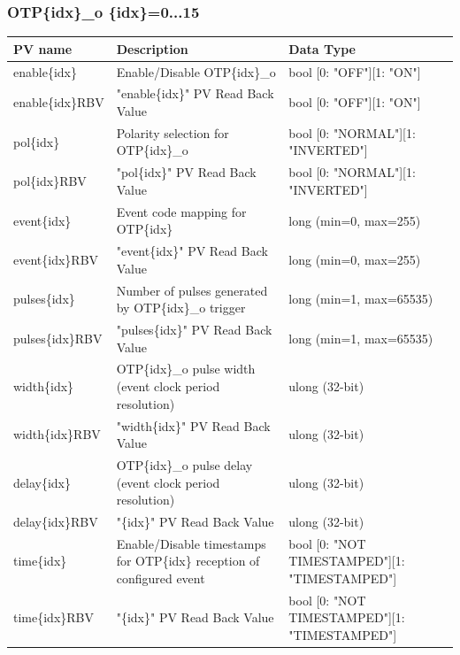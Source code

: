 \documentclass[openany]{article}
\begin{document}
		\subsubsection{OTP\{idx\}\_o \{idx\}=0...15}\label{pvgroup:evre-otp}
			\begin{center}
			\begin{tabular}{| m{2.8cm} m{6cm} m{6cm} |}
			    \hline
			    \bfseries PV name & \bfseries Description & \bfseries Data Type \\ \hline
			    enable\{idx\} & Enable/Disable OTP\{idx\}\_o & bool [0: "OFF"][1: "ON"] \\ \hline
			    enable\{idx\}RBV & "enable\{idx\}" PV Read Back Value & bool [0: "OFF"][1: "ON"] \\ \hline
			    pol\{idx\} & Polarity selection for OTP\{idx\}\_o & bool [0: "NORMAL"][1: "INVERTED"] \\ \hline
			    pol\{idx\}RBV & "pol\{idx\}" PV Read Back Value & bool [0: "NORMAL"][1: "INVERTED"] \\ \hline
			    event\{idx\} & Event code mapping for OTP\{idx\} & long (min=0, max=255) \\ \hline
			    event\{idx\}RBV & "event\{idx\}" PV Read Back Value & long (min=0, max=255) \\ \hline
			    pulses\{idx\} & Number of pulses generated by OTP\{idx\}\_o trigger & long (min=1, max=65535) \\ \hline
			    pulses\{idx\}RBV & "pulses\{idx\}" PV Read Back Value & long (min=1, max=65535) \\ \hline
			    width\{idx\} & OTP\{idx\}\_o pulse width (event clock period resolution) & ulong (32-bit) \\ \hline
			    width\{idx\}RBV & "width\{idx\}" PV Read Back Value & ulong (32-bit) \\ \hline
			    delay\{idx\} & OTP\{idx\}\_o pulse delay (event clock period resolution) & ulong (32-bit) \\ \hline
			    delay\{idx\}RBV & "\{idx\}" PV Read Back Value & ulong (32-bit) \\ \hline
			    time\{idx\} & Enable/Disable timestamps for OTP\{idx\} reception of configured event & bool [0: "NOT TIMESTAMPED"][1: "TIMESTAMPED"] \\ \hline
			    time\{idx\}RBV & "\{idx\}" PV Read Back Value & bool [0: "NOT TIMESTAMPED"][1: "TIMESTAMPED"] \\ \hline
			\end{tabular}
			\end{center}
\end{document}
